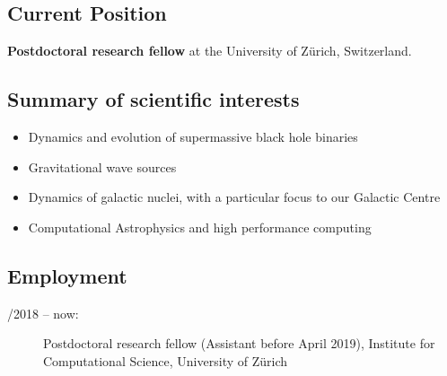 
\subsection*{Current Position}

{\bf Postdoctoral research fellow} at the University of Z\"urich, Switzerland. 

\subsection*{Summary of scientific interests}
\begin{itemize}
\item Dynamics and evolution of supermassive black hole binaries 
\item Gravitational wave sources
\item Dynamics of galactic nuclei, with a particular focus to our Galactic Centre \item Computational Astrophysics and high performance computing
\end{itemize}

\subsection*{Employment}
\begin{description}
  \item[/2018 -- now:] Postdoctoral research fellow (Assistant before April 2019), Institute for Computational Science,  University of Z\"urich 
\end{description}

